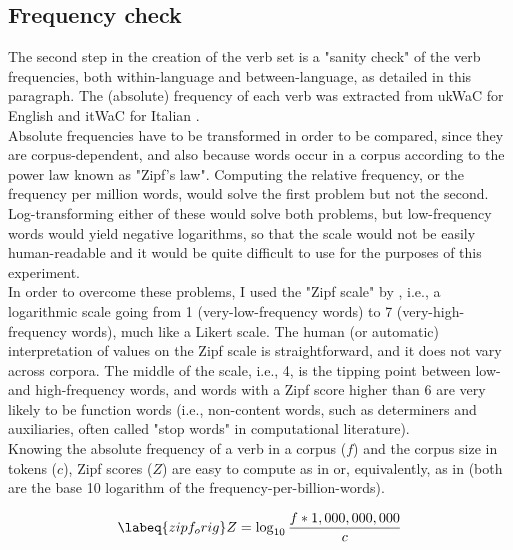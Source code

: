 \subsection{Frequency check} 
The second step in the creation of the verb set is a "sanity check" of the verb frequencies, both within-language and between-language, as detailed in this paragraph. The (absolute) frequency of each verb was extracted from ukWaC for English and itWaC for Italian \parencite{baroni2009wacky}.\\
Absolute frequencies have to be transformed in order to be compared, since they are corpus-dependent, and also because words occur in a corpus according to the power law known as "Zipf's law".
Computing the relative frequency, or the frequency per million words, would solve the first problem but not the second. Log-transforming either of these would solve both problems, but low-frequency words would yield negative logarithms, so that the scale would not be easily human-readable and it would be quite difficult to use for the purposes of this experiment.\\
In order to overcome these problems, I used the "Zipf scale" by \textcite{van2014subtlex}, i.e., a logarithmic scale going from 1 (very-low-frequency words) to 7 (very-high-frequency words), much like a Likert scale. The human (or automatic) interpretation of values on the Zipf scale is straightforward, and it does not vary across corpora. The middle of the scale, i.e., 4, is the tipping point between low- and high-frequency words, and words with a Zipf score higher than 6 are very likely to be function words (i.e., non-content words, such as determiners and auxiliaries, often called "stop words" in computational literature).\\
Knowing the absolute frequency of a verb in a corpus ($f$) and the corpus size in tokens ($c$), Zipf scores ($Z$) are easy to compute as in  or, equivalently, as in  (both are the base 10 logarithm of the frequency-per-billion-words).

\begin{equation} \labeq{zipf_orig}
Z = \log _{10} \frac{f*1,000,000,000}{c}
\end{equation}

